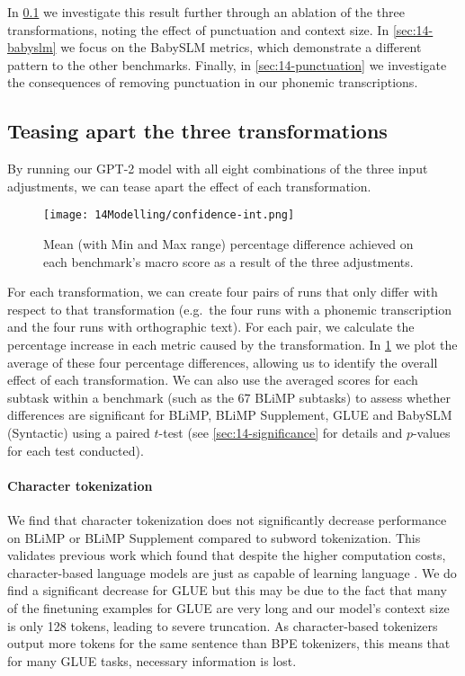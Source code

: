In \cref{sec:14-effect} we investigate this result further through an ablation of the three transformations, noting the effect of punctuation and context size. In \cref{sec:14-babyslm} we focus on the BabySLM metrics, which demonstrate a different pattern to the other benchmarks. Finally, in \cref{sec:14-punctuation} we investigate the consequences of removing punctuation in our phonemic transcriptions.

\subsection{Teasing apart the three transformations}\label{sec:14-effect}

By running our GPT-2 model with all eight combinations of the three input adjustments, we can tease apart the effect of each transformation.

\begin{figure}
    \centering
    \texttt{[image: 14Modelling/confidence-int.png]}
      \caption{Mean (with Min and Max range) percentage difference achieved on each benchmark's macro score as a result of the three adjustments.}
    \label{fix:14-condition-differences}
\vspace{-4mm}
\end{figure}



For each transformation, we can create four pairs of runs that only differ with respect to that transformation (e.g.\ the four runs with a phonemic transcription and the four runs with orthographic text). For each pair, we calculate the percentage increase in each metric caused by the transformation. In \cref{fix:14-condition-differences} we plot the average of these four percentage differences, allowing us to identify the overall effect of each transformation. We can also use the averaged scores for each subtask within a benchmark (such as the 67 BLiMP subtasks) to assess whether differences are significant for BLiMP, BLiMP Supplement, GLUE and BabySLM (Syntactic) using a paired $t$-test (see \cref{sec:14-significance} for details and $p$-values for each test conducted).

\paragraph{Character tokenization} We find that character tokenization does not significantly decrease performance on BLiMP or BLiMP Supplement compared to subword tokenization. This validates previous work which found that despite the higher computation costs, character-based language models are just as capable of learning language \citep{al-rfou_character-level_2019, hahn-baroni-2019-tabula}. We do find a significant decrease for GLUE but this may be due to the fact that many of the finetuning examples for GLUE are very long and our model's context size is only 128 tokens, leading to severe truncation. As character-based tokenizers output more tokens for the same sentence than BPE tokenizers, this means that for many GLUE tasks, necessary information is lost.

